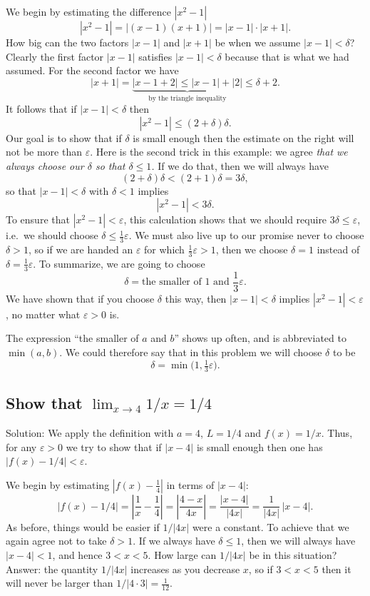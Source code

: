 We begin by estimating the difference $|x^2-1|$
\[
|x^2-1| = |(x-1)(x+1)| = |x-1|\cdot|x+1|.
\]
How big can the two factors $|x-1|$ and $|x+1|$ be when we assume
$|x-1|<\delta$?  Clearly the first factor $|x-1|$ satisfies $|x-1|<\delta$
because that is what we had assumed.
%
For the second factor we have
\[
|x+1| = \underbrace{|x-1 +2| \leq |x-1| + |2|}_{\text{by the triangle inequality}}
\leq \delta + 2.
\]
It follows that if $|x-1|<\delta$ then 
\[
|x^2-1| \leq (2+\delta)\delta.
\]
Our goal is to show that if $\delta$ is small enough then the estimate on the
right will not be more than $\varepsilon$.  Here is the second trick in this
example: we agree \textit{that we always choose our $\delta$ so that $\delta\leq
  1$.}  If we do that, then we will always have
\[
(2+\delta)\delta < (2+1)\delta =3\delta,
\]
so that $|x-1|<\delta$ with $\delta<1$ implies
\[
|x^2-1| < 3\delta.
\]
To ensure that $|x^2-1|<\varepsilon$, this calculation shows that we should
require $3\delta\leq \varepsilon$, i.e.\ we should choose $\delta \leq
\frac13\varepsilon$.  We must also live up to our promise never to choose
$\delta>1$, so if we are handed an $\varepsilon$ for which
$\frac13\varepsilon>1$, then we choose $\delta=1$ instead of $\delta =
\frac13\varepsilon$.  To summarize, we are going to choose
\[
\delta = \text{the smaller of }1\text{ and }\frac13\varepsilon.
\]
We have shown that if you choose $\delta$ this way, then $|x-1|<\delta$
implies $|x^2-1|<\varepsilon$, no matter what $\varepsilon>0$ is.

The expression ``the smaller of $a$ and $b$'' shows up often, and is
abbreviated to $\min(a, b)$.  We could therefore say that in this problem
we will choose $\delta$ to be
\[
\delta = \min \bigl(1, \tfrac13 \varepsilon\bigr).
\]


\subsection{Show that $\lim_{x\to 4}1/x = 1/4$}

Solution: We apply the definition with $a=4$, $L=1/4$ and $f(x) = 1/x$.
Thus, for any $\varepsilon>0$ we try to show that if $|x-4|$ is small
enough then one has $|f(x)-1/4|<\varepsilon$.

We begin by estimating $|f(x)-\frac14|$ in terms of $|x-4|$:
\[
|f(x)-1/4| = \left|\frac1x-\frac14\right| = \left| \frac{4-x}{4x}\right| =
\frac{|x-4|}{|4x|} =\frac{1}{|4x|}\,|x-4|.
\]
As before, things would be easier if $1/|4x|$ were a constant.  To achieve that
we again agree not to take $\delta>1$.  If we always have $\delta\leq 1$, then
we will always have $|x-4|<1$, and hence $3<x<5$.  How large can $1/|4x|$ be in
this situation?  Answer: the quantity $1/|4x|$ increases as you decrease $x$, so
if $3<x<5$ then it will never be larger than $1/|4\cdot 3| = \frac1{12}$.

